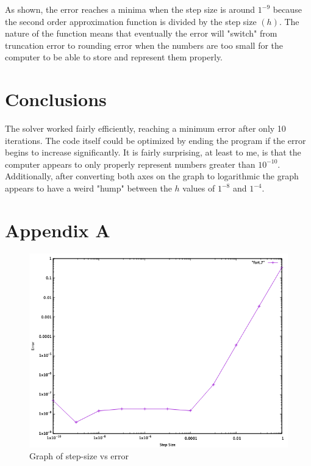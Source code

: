 \documentclass[12pt, letterpaper]{article}
\begin{document}
	As shown, the error reaches a minima when the step size is around $1^{-9}$ because the second order approximation function is divided by the step size $(h)$. The nature of the function means that eventually the error will "switch" from truncation error to rounding error when the numbers are too small for the computer to be able to store and represent them properly.
	
\section{Conclusions}
	The solver worked fairly efficiently, reaching a minimum error after only 10 iterations. The code itself could be optimized by ending the program if the error begins to increase significantly. It is fairly surprising, at least to me, is that the computer appears to only properly represent numbers greater than $10^{-10}$.  Additionally, after converting both axes on the graph to logarithmic the graph appears to have a weird "hump" between the $h$ values of $1^{-8}$ and $1^{-4}$.

\pagebreak

\appendix
	\section{Appendix A}
		\begin{figure}[h]
			\centering
			\includegraphics[width=\linewidth]{StepVsErrorGraph.png}
			\caption{Graph of step-size vs error}
			\label{fig:graph}
		\end{figure}
	\pagebreak
	
\end{document}
